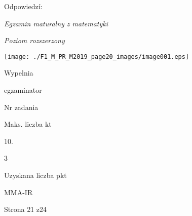 \documentclass[a4paper,12pt]{article}
\begin{document}
Odpowiedzí:

{\it Egzamin maturalny z matematyki}

{\it Poziom rozszerzony}
\begin{center}
\texttt{[image: ./F1\_M\_PR\_M2019\_page20\_images/image001.eps]}
\end{center}
Wypelnia

egzaminator

Nr zadania

Maks. liczba kt

10.

3

Uzyskana liczba pkt

MMA-IR

Strona 21 z24
\end{document}
